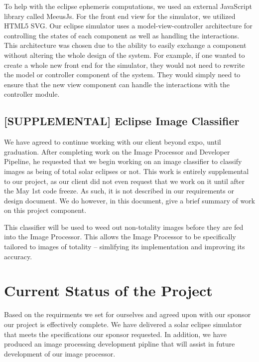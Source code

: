 \documentclass[10pt, onecolumn, draftclsnofoot, letterpaper, compsoc]{IEEEtran}
\begin{document}
To help with the eclipse ephemeris computations, we used an external
JavaScript library called MeeusJs. For the front end view for the simulator,
we utilized HTML5 SVG. Our eclipse simulator uses a model-view-controller
architecture for controlling the states of each component as well as handling
the interactions. This architecture was chosen due to the ability to easily
exchange a component without altering the whole design of the system. For
example, if one wanted to create a whole new front end for the simulator,
they would not need to rewrite the model or controller component of the system.
They would simply need to ensure that the new view component can handle the
interactions with the controller module. \\

\subsection{[SUPPLEMENTAL] Eclipse Image Classifier}

We have agreed to continue working with our client beyond expo, until graduation.
After completing work on the Image Processor and Developer Pipeline, he
requested that we begin working on an image classifier to classify images as being of
total solar eclipses or not. This work is entirely supplemental to our project, as
our client did not even request that we work on it until after the May 1st code freeze.
As such, it is not described in our requirements or design document. We do however, in this
document, give a brief summary of work on this project component.

This classifier will be used to weed out non-totality images before they are fed into the
Image Processor. This allows the Image Processor to be specifically tailored to images
of totality -- simlifying its implementation and improving its accuracy. \\

\section{Current Status of the Project}

Based on the requirments we set for ourselves and agreed upon with our sponsor
our project is effectively complete. We have delivered a solar eclipse simulator
that meets the specifications our sponsor requested. In addition, we have
produced an image processing development pipline that will assist in future
development of our image processor. \\
\end{document}

